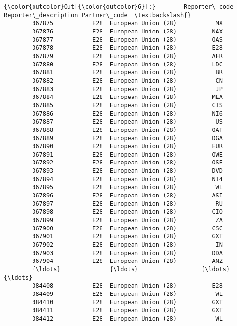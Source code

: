 \documentclass[11pt]{article}
\begin{document}
\begin{Verbatim}[commandchars=\\\{\}]
{\color{outcolor}Out[{\color{outcolor}6}]:}        Reporter\_code Reporter\_description Partner\_code  \textbackslash{}
        367875           E28  European Union (28)           MX   
        367876           E28  European Union (28)          NAX   
        367877           E28  European Union (28)          OAS   
        367878           E28  European Union (28)          E28   
        367879           E28  European Union (28)          AFR   
        367880           E28  European Union (28)          LDC   
        367881           E28  European Union (28)           BR   
        367882           E28  European Union (28)           CN   
        367883           E28  European Union (28)           JP   
        367884           E28  European Union (28)          MEA   
        367885           E28  European Union (28)          CIS   
        367886           E28  European Union (28)          NI6   
        367887           E28  European Union (28)           US   
        367888           E28  European Union (28)          OAF   
        367889           E28  European Union (28)          DGA   
        367890           E28  European Union (28)          EUR   
        367891           E28  European Union (28)          OWE   
        367892           E28  European Union (28)          OSE   
        367893           E28  European Union (28)          DVD   
        367894           E28  European Union (28)          NI4   
        367895           E28  European Union (28)           WL   
        367896           E28  European Union (28)          ASI   
        367897           E28  European Union (28)           RU   
        367898           E28  European Union (28)          CIO   
        367899           E28  European Union (28)           ZA   
        367900           E28  European Union (28)          CSC   
        367901           E28  European Union (28)          GXT   
        367902           E28  European Union (28)           IN   
        367903           E28  European Union (28)          DDA   
        367904           E28  European Union (28)          ANZ   
        {\ldots}              {\ldots}                  {\ldots}          {\ldots}   
        384408           E28  European Union (28)          E28   
        384409           E28  European Union (28)           WL   
        384410           E28  European Union (28)          GXT   
        384411           E28  European Union (28)          GXT   
        384412           E28  European Union (28)           WL   

\end{Verbatim}
\end{document}
